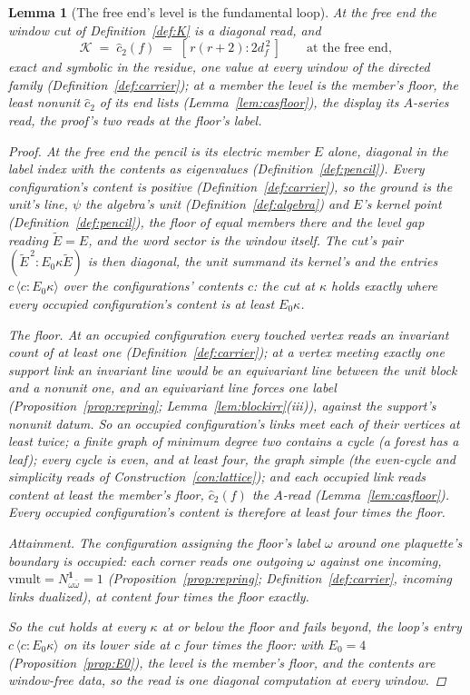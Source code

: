 \documentclass[11pt]{article}
\newtheorem{lemma}{Lemma}
\theoremstyle{definition}
\begin{document}
\begin{lemma}[The free end's level is the fundamental loop]
\label{lem:freeend}
At the free end the window cut of Definition~\ref{def:K} is a diagonal read, and
\[
\mathcal K\;=\;\hat c_2(f)\;=\;[\,r(r+2):2d_f^{\,2}\,]
\qquad\text{at the free end},
\]
exact and symbolic in the residue, one value at every window of the
directed family (Definition~\ref{def:carrier}); at
a member the level is the member's floor, the least nonunit
$\hat c_2$ of its end lists (Lemma~\ref{lem:casfloor}), the
display its $A$-series read, the proof's two reads at the
floor's label.
\begin{proof}
At the free end the pencil is its electric member $E$ alone,
diagonal in the label index with the
contents as eigenvalues (Definition~\ref{def:pencil}). Every
configuration's content is positive
(Definition~\ref{def:carrier}), so the ground is the unit's line,
$\psi$ the algebra's unit
(Definition~\ref{def:algebra}) and $E$'s kernel point
(Definition~\ref{def:pencil}), the floor of equal members there and the
level gap reading $\tilde E=E$, and
the word sector is the window itself.
The cut's pair $(\tilde E^{\,2}:E_0\kappa\tilde E)$ is then
diagonal, the unit summand its kernel's and the
entries $c\,\langle c:E_0\kappa\rangle$ over the configurations'
contents $c$: the cut
at $\kappa$ holds exactly where every occupied configuration's
content is at least $E_0\kappa$.

\emph{The floor.} At an occupied configuration every touched vertex
reads an invariant count of at least one (Definition~\ref{def:carrier});
at a vertex
meeting exactly one support link an invariant line would be an
equivariant line between the unit block and a nonunit one, and an
equivariant line forces one label
(Proposition~\ref{prop:repring}; Lemma~\ref{lem:blockirr}(iii)),
against the support's nonunit datum. So an occupied configuration's
links meet each of their vertices at least twice; a finite graph of
minimum degree two contains a cycle (a forest has a leaf); every
cycle is even, and at least four, the graph simple (the even-cycle
and simplicity reads of Construction~\ref{con:lattice}); and each
occupied link
reads content at least the member's floor, $\hat c_2(f)$ the
$A$-read (Lemma~\ref{lem:casfloor}).
Every occupied configuration's content is therefore at least
four times the floor.

\emph{Attainment.} The configuration assigning the floor's label
$\omega$ around one plaquette's
boundary is occupied: each corner reads one
outgoing $\omega$ against one incoming,
$\mathrm{vmult}=N^{\mathbf 1}_{\omega\bar\omega}=1$
(Proposition~\ref{prop:repring}; Definition~\ref{def:carrier}, incoming
links dualized), at content four times the floor exactly.

So the cut holds at every $\kappa$ at or below the floor and
fails beyond, the
loop's entry $c\,\langle c:E_0\kappa\rangle$ on its lower side at
$c$ four times the floor: with
$E_0=4$ (Proposition~\ref{prop:E0}), the level is the member's
floor, and the
contents are window-free data, so the read is one diagonal computation at
every window.
\end{proof}

\end{lemma}
\end{document}
